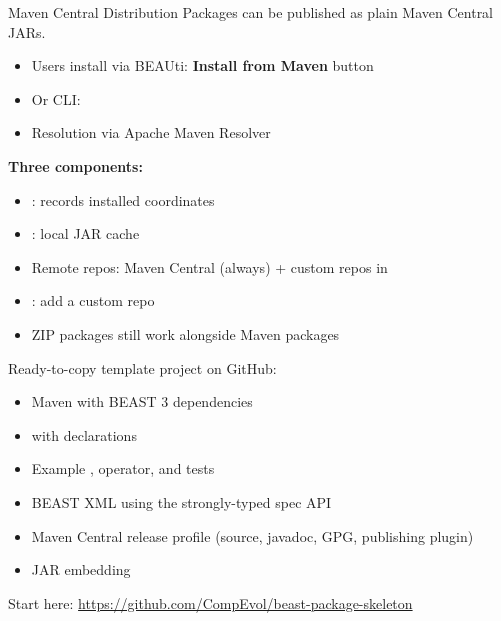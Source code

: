 \begin{frame}{Maven Central Distribution}
Packages can be published as plain Maven Central JARs.

\vspace{0.5em}
\begin{itemize}
\item Users install via BEAUti: \textbf{Install from Maven} button
\item Or CLI: 
\item Resolution via Apache Maven Resolver
\end{itemize}

\vspace{0.5em}
\textbf{Three components:}
\begin{itemize}
\item {}: records installed coordinates
\item {}: local JAR cache
\item Remote repos: Maven Central (always) + custom repos in 
\end{itemize}

\vspace{0.5em}
\begin{itemize}
\item {}: add a custom repo
\item ZIP packages still work alongside Maven packages
\end{itemize}
\end{frame}

\begin{frame}{}
Ready-to-copy template project on GitHub:

\vspace{0.5em}
\begin{itemize}
\item Maven  with BEAST 3 dependencies
\item {} with  declarations
\item Example , operator, and tests
\item BEAST XML using the strongly-typed spec API
\item Maven Central release profile (source, javadoc, GPG, publishing plugin)
\item {} JAR embedding
\end{itemize}

\vspace{1em}
\begin{exampleblock}{}
Start here: \url{https://github.com/CompEvol/beast-package-skeleton}
\end{exampleblock}
\end{frame}
